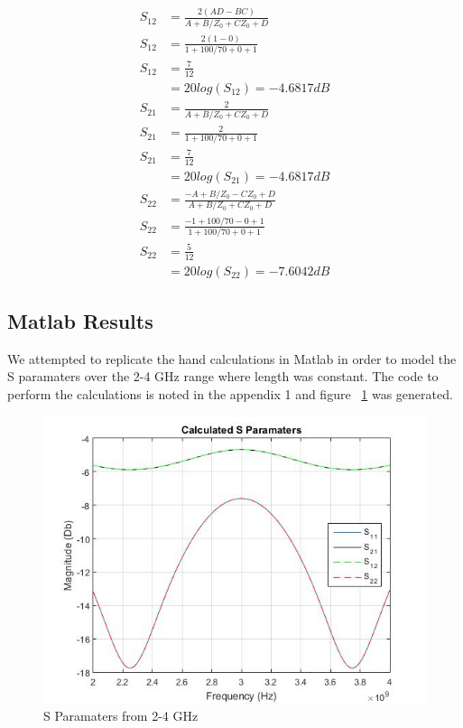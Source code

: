 \documentclass{paper}
\begin{document}
\begin{align}
S_{12} &= \frac{2(AD-BC)}{A+B/Z_0+CZ_0+D}\\
S_{12} &= \frac{2(1-0)}{1+100/70+0+1}\\
S_{12} &= \frac{7}{12} \\ 
&= 20log(S_{12})= -4.6817dB
\end{align}
\begin{align}
S_{21} &= \frac{2}{A+B/Z_0+CZ_0+D}\\
S_{21} &= \frac{2}{1+100/70+0+1}\\
S_{21} &= \frac{7}{12} \\
&= 20log(S_{21})= -4.6817dB
\end{align}
\begin{align}
S_{22} &= \frac{-A+B/Z_0-CZ_0+D}{A+B/Z_0 +CZ_0+D}\\
S_{22} &= \frac{-1+100/70-0+1}{1+100/70+0+1}\\
S_{22} &= \frac{5}{12} \\
&= 20log(S_{22})= -7.6042dB
\end{align}
\subsection{Matlab Results}
We attempted to replicate the hand calculations in Matlab in order to model the S paramaters over the 2-4 GHz range where length was constant. The code to perform the calculations is noted in the appendix 1 and figure ~\ref{fig:matlab_S} was generated.

\begin{figure}[H]
	\centering
	\includegraphics[scale=0.5]{IMG/ideal_sweep}
	\caption{S Paramaters from 2-4 GHz}
	\label{fig:matlab_S}
\end{figure}
\end{document}
